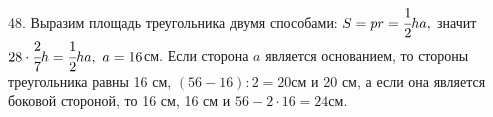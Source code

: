 48. Выразим площадь треугольника двумя способами: $S=pr=\cfrac{1}{2}ha,$ значит $28\cdot\cfrac{2}{7}h=\cfrac{1}{2}ha,\ a=16$см. Если сторона $a$ является основанием, то стороны треугольника равны 16 см, $(56-16):2=20$см и 20 см, а если она является боковой стороной, то 16 см, 16 см и $56-2\cdot16=24$см.\\
